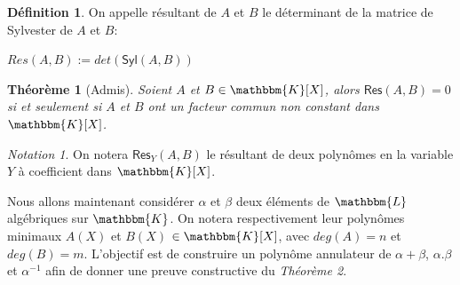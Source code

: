 \documentclass[12pt]{article}
\newcommand{\jL}{\mathbbm{L}}
\newcommand{\K}{\mathbbm{K}}
\newtheorem{thm}{Théorème}
\theoremstyle{definition}\newtheorem{defn}{Définition}
\theoremstyle{definition}\newtheorem{exm}{Exemple}
\theoremstyle{definition}\newtheorem{rem}{Remarque}
\theoremstyle{definition}\newtheorem{algo}{Algorithme}
\theoremstyle{remark}\newtheorem{exo}{Exercice}
\theoremstyle{remark}\newtheorem{nota}{Notation}
\begin{document}
\begin{defn}
On appelle résultant de $A$ et $B$ le déterminant de la matrice de Sylvester de $A$ et $B$:
\begin{center} $Res(A,B) := det(\textsf{Syl}(A,B))$ \end{center}
\end{defn}

\begin{thm}[Admis]
Soient $A$ et $B \in \K[X]$, alors $\textsf{Res}(A,B) = 0$ si et seulement si $A$ et $B$ ont un facteur commun non constant dans $\K[X]$.
\end{thm}

\begin{nota}
On notera $\textsf{Res}_Y(A,B)$ le résultant de deux polynômes en la variable $Y$ à coefficient dans $\K[X]$.
\end{nota}

Nous allons maintenant considérer $\alpha$ et $\beta$ deux éléments de $\jL$ algébriques sur $\K$. On notera respectivement leur polynômes minimaux $A(X)$ et $B(X)$ $\in \K[X]$, avec $deg(A) = n$ et $deg(B) = m$. L'objectif est de construire un polynôme annulateur de $\alpha + \beta$, $\alpha.\beta$ et $\alpha^{-1}$ afin de donner une preuve constructive du \textit{Théorème 2}.
\end{document}
